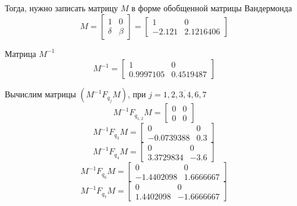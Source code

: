 Тогда, нужно записать матрицу $M$ в форме обобщенной матрицы Вандермонда
\begin{equation}
	M = 
	\begin{bmatrix}
	1&0\\
	\delta&\beta
	\end{bmatrix}
	=
	\begin{bmatrix}
	1&0\\
	-2.121&  2.1216406 
	\end{bmatrix}
\end{equation}

Матрица $M^{-1}$
\begin{equation}
	M^{-1} = 
	\begin{bmatrix}
	   1&           0\\         
	0.9997105  &  0.4519487 
	\end{bmatrix}
\end{equation}

Вычислим матрицы $(M^{-1} F_{q_j} M)$, при $j = \overline{1,2,3,4,6,7}$
\begin{equation}
	M^{-1} F_{q_{1,2}} M = 
	\begin{bmatrix}
	0&0\\
	0&0	
	\end{bmatrix}
\end{equation}
\begin{equation}
	M^{-1} F_{q_3} M = 
	\begin{bmatrix}
	    0&           0\\   
	- 0.0739388  &  0.3 	
	\end{bmatrix}
\end{equation}
\begin{equation}
	M^{-1} F_{q_4} M = 
	\begin{bmatrix}
	    0&           0\\   
	3.3729834 & - 3.6
	\end{bmatrix}
\end{equation}
\begin{equation}
	M^{-1} F_{q_6} M = 
	\begin{bmatrix}
	    0&           0\\         
	- 1.4402098&    1.6666667 
	\end{bmatrix}
\end{equation}
\begin{equation}
	M^{-1} F_{q_7} M = 
	\begin{bmatrix}
    0&           0\\         
	1.4402098 & - 1.6666667 	
	\end{bmatrix}
\end{equation}

